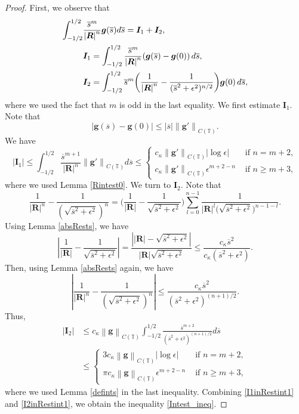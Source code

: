 \documentclass[11pt]{article}
\numberwithin{equation}{section}
\newcommand{\T}{\mathbb{T}}
\newcommand{\bars}{\overline s}
\newcommand{\ts}{\thinspace}
\newcommand{\abs}[1]{\left\lvert #1 \right\rvert}
\newcommand{\norm}[1]{\left\lVert #1 \right\rVert}
\theoremstyle{definition}
\begin{document}
\begin{proof}
First, we observe that
\begin{equation}
\begin{split}
\int^{1/2}_{-1/2}&\frac{\bars^m}{\abs{\bm{R}}^n}\bm{g}(\bars)d\bars = \bm{I}_1+\bm{I}_2, \\
&\bm{I}_1=\int_{-1/2}^{1/2}\frac{\bars^m}{\abs{\bm{R}}^n}(\bm{g}(\bars)-\bm{g}(0)) \ts d\bars,\\
&\bm{I}_2=\int_{-1/2}^{1/2}\bars^m\bigg(\frac{1}{\abs{\bm{R}}^n}-\frac{1}{(\bars^2+\epsilon^2)^{n/2}}\bigg) \bm{g}(0) \ts d\bars,
\end{split}
\end{equation}
where we used the fact that $m$ is odd in the last equality. We first estimate $\bm{I}_1$. Note that
\[ \abs{\bm{g}(\bars)-\bm{g}(0)}\le \abs{\bars}\norm{\bm{g}'}_{C(\T)}. \]
We have
\begin{equation}\label{I1inRestint1}
\abs{\bm{I}_1}\le \int_{-1/2}^{1/2}\frac{\bars^{m+1}}{\abs{\bm{R}}^n}\norm{\bm{g}'}_{C(\T)}d\bars \le
\begin{cases}
c_\kappa \norm{\bm{g}'}_{C(\T)}\abs{\log \epsilon} &\text{ if } n=m+2,\\
c_\kappa \norm{\bm{g}'}_{C(\T)}\epsilon^{m+2-n} &\text{ if } n\ge m+3,
\end{cases}
\end{equation}
where we used Lemma \ref{Rintest0}. We turn to $\bm{I}_2$. Note that
\[ \frac{1}{\abs{\bm{R}}^n}-\frac{1}{(\sqrt{\bars^2+\epsilon^2})^n}=
\bigg(\frac{1}{\abs{\bm{R}}}-\frac{1}{\sqrt{\bars^2+\epsilon^2}}\bigg) \sum_{l=0}^{n-1}\frac{1}{\abs{\bm{R}}^{l}\big(\sqrt{\bars^2+\epsilon^2}\big)^{n-1-l}}. \]
Using Lemma \ref{absRests}, we have
\[ \abs{\frac{1}{\abs{\bm{R}}}-\frac{1}{\sqrt{\bars^2+\epsilon^2}}}
=\frac{\abs{\abs{\bm{R}}-\sqrt{\bars^2+\epsilon^2}}}{\abs{\bm{R}}\sqrt{\bars^2+\epsilon^2}}
\le \frac{c_\kappa\bars^2}{c_\kappa(\bars^2+\epsilon^2)}. \]
Then, using Lemma \ref{absRests} again, we have
\begin{equation}\label{Rnsigman}
 \abs{\frac{1}{\abs{\bm{R}}^n}-\frac{1}{(\sqrt{\bars^2+\epsilon^2})^n}} \le \frac{c_\kappa\bars^2}{(\bars^2+\epsilon^2)^{(n+1)/2}}.
 \end{equation}
 Thus,
\begin{equation}\label{I2inRestint1}
\begin{split}
\abs{\bm{I}_2}&\le c_\kappa\norm{\bm{g}}_{C(\T)}\int_{-1/2}^{1/2}\frac{\bars^{m+2}}{(\bars^2+\epsilon^2)^{(n+1)/2}}d\bars \\
&\le \begin{cases}
3 c_\kappa\norm{\bm{g}}_{C(\T)}\abs{\log \epsilon}&\text{ if } n=m+2,\\
\pi c_\kappa\norm{\bm{g}}_{C(\T)}\epsilon^{m+2-n} &\text{ if } n\ge m+3,
\end{cases}
\end{split}
\end{equation}
where we used Lemma \ref{defints} in the last inequality. Combining \eqref{I1inRestint1} and \eqref{I2inRestint1}, we obtain the inequality \eqref{Intest_ineq}.
\end{proof}
\end{document}

